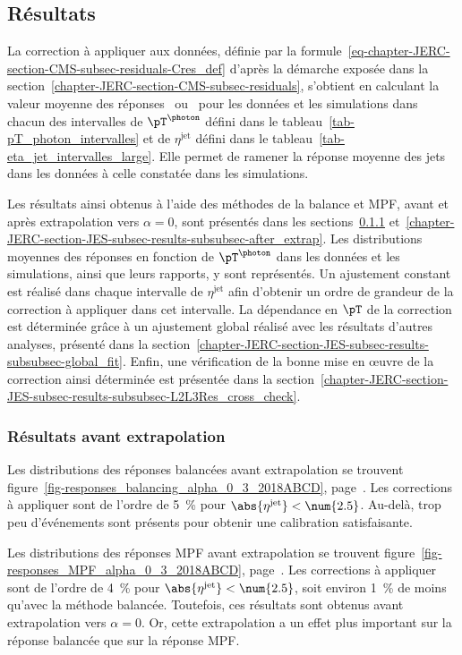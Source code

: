 \subsection{Résultats}\label{chapter-JERC-section-JES-subsec-results}
La correction à appliquer aux données, définie par la formule~\eqref{eq-chapter-JERC-section-CMS-subsec-residuals-Cres_def} d'après la démarche exposée dans la section~\ref{chapter-JERC-section-CMS-subsec-residuals}, s'obtient en calculant la valeur moyenne des réponses \Rbal\ ou \RMPF\ pour les données et les simulations dans chacun des intervalles
de $\pT^{\photon}$ défini dans le tableau~\ref{tab-pT_photon_intervalles} et
de $\eta^\text{jet}$ défini dans le tableau~\ref{tab-eta_jet_intervalles_large}.
Elle permet de ramener la réponse moyenne des jets dans les données à celle constatée dans les simulations.
\par Les résultats ainsi obtenus à l'aide des méthodes de la balance et MPF, avant et après extrapolation vers $\alpha=0$, sont présentés dans les sections~\ref{chapter-JERC-section-JES-subsec-results-subsubsec-before_extrap} et~\ref{chapter-JERC-section-JES-subsec-results-subsubsec-after_extrap}.
Les distributions moyennes des réponses en fonction de $\pT^{\photon}$ dans les données et les simulations, ainsi que leurs rapports, y sont représentés.
Un ajustement constant est réalisé dans chaque intervalle de $\eta^\text{jet}$ afin d'obtenir un ordre de grandeur de la correction à appliquer dans cet intervalle.
La dépendance en $\pT$ de la correction est déterminée grâce à un ajustement global réalisé avec les résultats d'autres analyses, présenté dans la section~\ref{chapter-JERC-section-JES-subsec-results-subsubsec-global_fit}.
Enfin, une vérification de la bonne mise en œuvre de la correction ainsi déterminée est présentée dans la section~\ref{chapter-JERC-section-JES-subsec-results-subsubsec-L2L3Res_cross_check}.
\subsubsection{Résultats avant extrapolation}\label{chapter-JERC-section-JES-subsec-results-subsubsec-before_extrap}
\par Les distributions des réponses balancées avant extrapolation se trouvent figure~\ref{fig-responses_balancing_alpha_0_3_2018ABCD}, page~\pageref{fig-responses_balancing_alpha_0_3_2018ABCD}.
Les corrections à appliquer sont de l'ordre de \SI{5}{\%} pour $\abs{\eta^\text{jet}} < \num{2.5}$.
Au-delà, trop peu d'événements sont présents pour obtenir une calibration satisfaisante.
\par Les distributions des réponses MPF avant extrapolation se trouvent figure~\ref{fig-responses_MPF_alpha_0_3_2018ABCD}, page~\pageref{fig-responses_MPF_alpha_0_3_2018ABCD}.
Les corrections à appliquer sont de l'ordre de \SI{4}{\%} pour $\abs{\eta^\text{jet}} < \num{2.5}$, soit environ \SI{1}{\%} de moins qu'avec la méthode balancée.
Toutefois, ces résultats sont obtenus avant extrapolation vers $\alpha=0$. Or, cette extrapolation a un effet plus important sur la réponse balancée que sur la réponse MPF.
